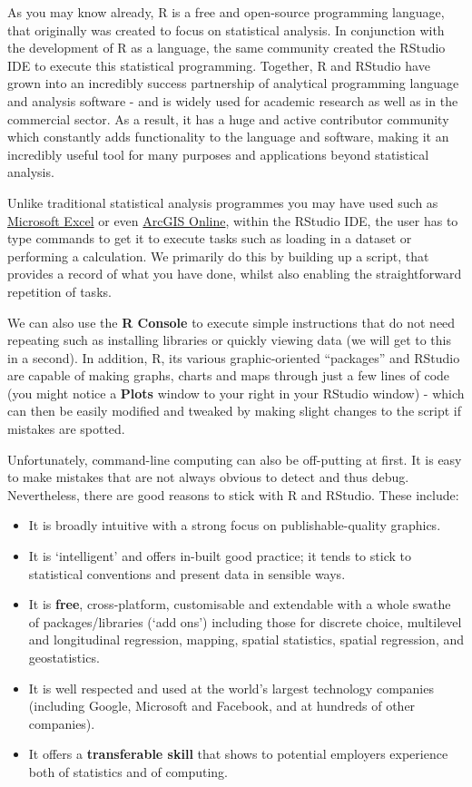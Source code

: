 \documentclass[
]{book}
\providecommand{\tightlist}{%
  \setlength{\itemsep}{0pt}\setlength{\parskip}{0pt}}
\begin{document}
As you may know already, R is a free and open-source programming language, that originally was created to focus on statistical analysis. In conjunction with the development of R as a language, the same community created the RStudio IDE to execute this statistical programming. Together, R and RStudio have grown into an incredibly success partnership of analytical programming language and analysis software - and is widely used for academic research as well as in the commercial sector. As a result, it has a huge and active contributor community which constantly adds functionality to the language and software, making it an incredibly useful tool for many purposes and applications beyond statistical analysis.

Unlike traditional statistical analysis programmes you may have used such as \href{https://www.microsoft.com/en-us/microsoft-365/excel}{Microsoft Excel} or even \href{https://www.arcgis.com/home/index.html}{ArcGIS Online}, within the RStudio IDE, the user has to type commands to get it to execute tasks such as loading in a dataset or performing a calculation. We primarily do this by building up a script, that provides a record of what you have done, whilst also enabling the straightforward repetition of tasks.

We can also use the \textbf{R Console} to execute simple instructions that do not need repeating such as installing libraries or quickly viewing data (we will get to this in a second). In addition, R, its various graphic-oriented ``packages'' and RStudio are capable of making graphs, charts and maps through just a few lines of code (you might notice a \textbf{Plots} window to your right in your RStudio window) - which can then be easily modified and tweaked by making slight changes to the script if mistakes are spotted.

Unfortunately, command-line computing can also be off-putting at first. It is easy to make mistakes that are not always obvious to detect and thus debug. Nevertheless, there are good reasons to stick with R and RStudio. These include:

\begin{itemize}
\tightlist
\item
  It is broadly intuitive with a strong focus on publishable-quality graphics.
\item
  It is `intelligent' and offers in-built good practice; it tends to stick to statistical conventions and present data in sensible ways.
\item
  It is \textbf{free}, cross-platform, customisable and extendable with a whole swathe of packages/libraries (`add ons') including those for discrete choice, multilevel and longitudinal regression, mapping, spatial statistics, spatial regression, and geostatistics.
\item
  It is well respected and used at the world's largest technology companies (including Google, Microsoft and Facebook, and at hundreds of other companies).
\item
  It offers a \textbf{transferable skill} that shows to potential employers experience both of statistics and of computing.
\end{itemize}
\end{document}

